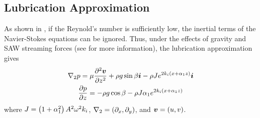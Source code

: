 
\subsection{Lubrication Approximation}
As shown in \cite{kondic2003instabilities}, if the Reynold's number is sufficiently low, the inertial terms of the Navier-Stokes equations 
can be ignored. Thus, under the effects of gravity and SAW streaming forces (see \cite{shiokawa1994saw} for more information), the lubrication approximation gives
\begin{gather}
    \nabla_2 p = \mu \frac{\partial^2 \boldsymbol{v}}{\partial z^2} + \rho g \sin\beta \boldsymbol{i} - \rho Je^{2k_i \left( x + \alpha_1 z \right)}\boldsymbol{i}
    \label{eq:pressure_grad}\\
    \frac{\partial p}{\partial z} = -\rho g \cos\beta - \rho J\alpha_1 e^{2k_i \left( x + \alpha_1 z \right)}
    \label{eq:pressure_z}
\end{gather}
where $J = \left( 1 + \alpha_1^2 \right)A^2\omega^2k_i$,  $\nabla_2 = \left( \partial_x, \partial_y \right)$, 
and $\boldsymbol{v} = \left( u, v \right)$. 


